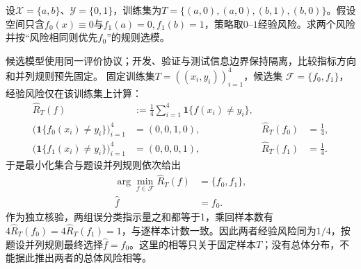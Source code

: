 \begin{example}[两个候选分类规则的经验比较]\label{exm:V1-C09-finite-class}\label{schema:V1-C09:CH-18}\label{schema:V1-C09:CH-32}
设$\mathcal X=\{a,b\}$、$\mathcal Y=\{0,1\}$，训练集为$T=\{(a,0),(a,0),(b,1),(b,0)\}$。假设空间只含$f_0(x)\equiv0$与$f_1(a)=0,f_1(b)=1$，策略取$0$--$1$经验风险。求两个风险并按“风险相同则优先$f_0$”的规则选模。
\end{example}
\label{schema:V1-C09:CH-33}
\begin{solution}
\SolGiven 候选模型使用同一评价协议；开发、验证与测试信息边界保持隔离，比较指标方向和并列规则预先固定。
\SolDerive
固定训练集$T=((x_i,y_i))_{i=1}^{4}$，候选集
$\mathcal F=\{f_0,f_1\}$，经验风险仅在该训练集上计算：
\[
\begin{aligned}
\widehat R_T(f)
  &:=\frac14\sum_{i=1}^{4}\mathbf 1\{f(x_i)\ne y_i\},\\
\bigl(\mathbf 1\{f_0(x_i)\ne y_i\}\bigr)_{i=1}^{4}
  &=(0,0,1,0),&
\widehat R_T(f_0)&=\frac14,\\
\bigl(\mathbf 1\{f_1(x_i)\ne y_i\}\bigr)_{i=1}^{4}
  &=(0,0,0,1),&
\widehat R_T(f_1)&=\frac14.
\end{aligned}
\]
于是最小化集合与题设并列规则依次给出
\[
\begin{aligned}
\arg\min_{f\in\mathcal F}\widehat R_T(f)&=\{f_0,f_1\},\\
\widehat f&=f_0.
\end{aligned}
\]
作为独立核验，两组误分类指示量之和都等于1，乘回样本数有$4\widehat R_T(f_0)=4\widehat R_T(f_1)=1$，与逐样本计数一致。因此两者经验风险同为$1/4$，按题设并列规则最终选择$\widehat f=f_0$。这里的相等只关于固定样本$T$；没有总体分布，不能据此推出两者的总体风险相等。
\end{solution}

